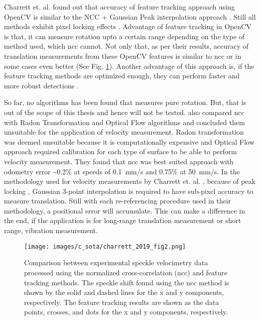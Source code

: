 \noindent Charrett et. al. found out that accuracy of feature tracking approach using OpenCV is similar to the NCC + Gaussian Peak interpolation approach \cite{charrett_2019}. Still all methods exhibit pixel locking effects \cite{raffel}. Advantage of feature tracking in OpenCV is that, it can measure rotation upto a certain range depending on the type of method used, which \gls{ncc} cannot. Not only that, as per their results, accuracy of translation measurements from these OpenCV features is similar to \gls{ncc} or in some cases even better (See Fig. \ref{fig:charrett_2019_fig2}). Another advantage of this approach is, if the feature tracking methods are optimized enough, they can perform faster and more robust detections \cite{charrett_2019}.

\vspace{5mm}
\noindent So far, no algorithms has been found that measures pure rotation. But, that is out of the scope of this thesis and hence will not be tested. \cite{charrett_mars} also compared \gls{ncc} with Radon Transformation and Optical Flow algorithms and concluded them unsuitable for the application of velocity measurement. Radon transformation was deemed unsuitable because it is computationally expensive and Optical Flow approach required calibration for each type of surface to be able to perform velocity measurement. They found that \gls{ncc} was best suited approach with odometry error \~{}0.2\% at speeds of \SI{0.1}{\milli\meter/\second} and 0.75\% at \SI{50}{\milli\meter/\second}. In the methodology used for velocity measurements by Charrett et. al. \cite{charrett_wpos}, because of peak locking \cite{raffel}, Gaussian 3-point interpolation is required to have sub-pixel accuracy to measure translation. Still with each re-referencing procedure used in their methodology, a positional error will accumulate. This can make a difference in the end, if the application is for long-range translation measurement or short range, vibration measurement.

\begin{figure}[h]
    \centering
    \texttt{[image: images/c\_sota/charrett\_2019\_fig2.png]}
    \caption{Comparison between experimental speckle velocimetry data processed using the normalized cross-correlation (\gls{ncc}) and feature tracking methods. The speckle shift found using the \gls{ncc} method is shown by the solid and dashed lines for the x and y components, respectively. The feature tracking results are shown as the data points, crosses, and dots for the x and y components, respectively. \cite{charrett_2019}}
    \label{fig:charrett_2019_fig2}
\end{figure} 

